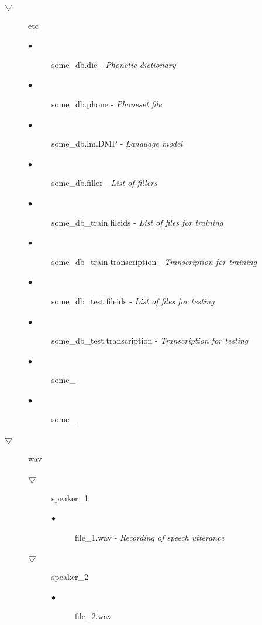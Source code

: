 \documentclass[12pt,a4paper,oneside]{memoir}
\begin{document}
\begin{description}
 \item[$\bigtriangledown$] etc
	\begin{description}
		\item[$\bullet$] some\_db.dic - \textit{Phonetic dictionary}
		\item[$\bullet$] some\_db.phone - \textit{Phoneset file}
		\item[$\bullet$] some\_db.lm.DMP - \textit{Language model}
		\item[$\bullet$] some\_db.filler - \textit{List of fillers}
		\item[$\bullet$] some\_db\_train.fileids - \textit{List of files for training}
		\item[$\bullet$] some\_db\_train.transcription - \textit{Transcription for training}
		\item[$\bullet$] some\_db\_test.fileids - \textit{List of files for testing}
		\item[$\bullet$] some\_db\_test.transcription - \textit{Transcription for testing}
		\item[$\bullet$] some\_
		\item[$\bullet$] some\_
	\end{description}
 \item[$\bigtriangledown$] wav
	\begin{description}
		\item[$\bigtriangledown$] speaker\_1
			\begin{description}
				\item[$\bullet$] file\_1.wav - \textit{Recording of speech utterance}
			\end{description}
		\item[$\bigtriangledown$] speaker\_2
			\begin{description}
				\item[$\bullet$]file\_2.wav
			\end{description}
	\end{description}	
\end{description}
\end{document}
